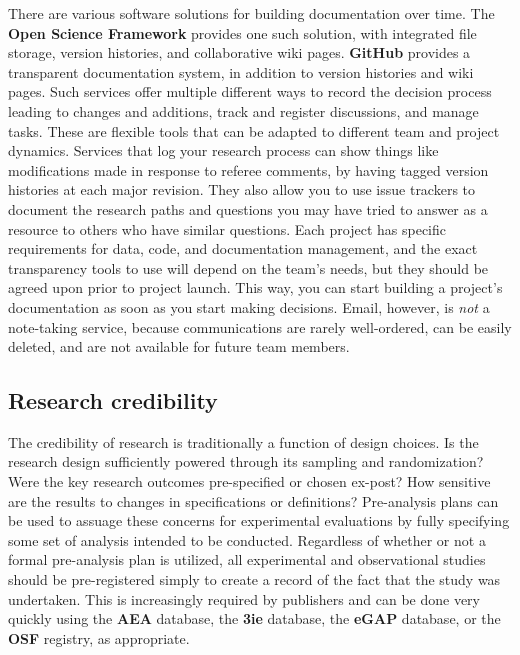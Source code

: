 There are various software solutions for building documentation over time.
The \textbf{Open Science Framework} provides one such solution,
with integrated file storage, version histories, and collaborative wiki pages.
\textbf{GitHub} provides a transparent documentation system,
in addition to version histories and wiki pages.
Such services offer multiple different ways
to record the decision process leading to changes and additions,
track and register discussions, and manage tasks.
These are flexible tools that can be adapted to different team and project dynamics.
Services that log your research process can show things like modifications made in response to referee comments, 
by having tagged version histories at each major revision.
They also allow you to use issue trackers
to document the research paths and questions you may have tried to answer
as a resource to others who have similar questions.
Each project has specific requirements for data, code, and documentation management,
and the exact transparency tools to use will depend on the team's needs,
but they should be agreed upon prior to project launch.
This way, you can start building a project's documentation as soon as you start making decisions.
Email, however, is \textit{not} a note-taking service, because communications are rarely well-ordered,
can be easily deleted, and are not available for future team members.

\subsection{Research credibility}

The credibility of research is traditionally a function of design choices.\cite{angrist2010credibility,ioannidis2005most}
Is the research design sufficiently powered through its sampling and randomization?
Were the key research outcomes pre-specified or chosen ex-post?
How sensitive are the results to changes in specifications or definitions?
Pre-analysis plans can be used to assuage these concerns for experimental evaluations
by fully specifying some set of analysis intended to be conducted.
Regardless of whether or not a formal pre-analysis plan is utilized,
all experimental and observational studies should be pre-registered
simply to create a record of the fact that the study was undertaken.
This is increasingly required by publishers and can be done very quickly
using the \textbf{AEA} database,
the \textbf{3ie} database,
the \textbf{eGAP} database,
or the \textbf{OSF} registry, as appropriate.

